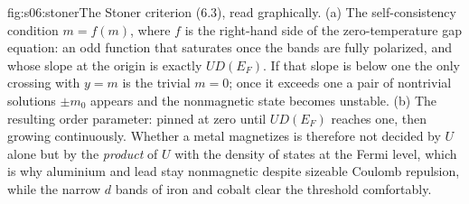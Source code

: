 %
\begin{aqmfigure}{fig:s06:stoner}{The Stoner criterion (6.3), read graphically. (a) The
self-consistency condition $m=f(m)$, where $f$ is the right-hand side of the zero-temperature gap
equation: an odd function that saturates once the bands are fully polarized, and whose slope at the
origin is exactly $U D(E_F)$. If that slope is below one the only crossing with $y=m$ is the
trivial $m=0$; once it exceeds one a pair of nontrivial solutions $\pm m_0$ appears and the
nonmagnetic state becomes unstable. (b) The resulting order parameter: pinned at zero until
$U D(E_F)$ reaches one, then growing continuously. Whether a metal magnetizes is therefore not
decided by $U$ alone but by the \emph{product} of $U$ with the density of states at the Fermi
level, which is why aluminium and lead stay nonmagnetic despite sizeable Coulomb repulsion, while
the narrow $d$ bands of iron and cobalt clear the threshold comfortably.}

\end{aqmfigure}
